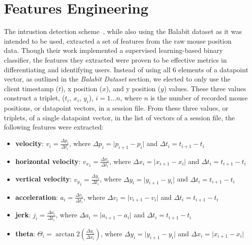 
\section{Features Engineering}\label{sec:features-engineering}
The intrustion detection scheme~\cite{intrustion_detection_using_mouse_dynamics}, while also using the Balabit dataset as it was intended to be used, extracted a set of features from the raw mouse position data.
Though their work implemented a supervised learning-based binary classifier, the features they extracted were proven to be effective metrics in differentiating and identifying users.
Instead of using all 6 elements of a datapoint vector, as outlined in the \textit{Balabit Dataset} section, we elected to only use the client timestamp ($t$), x position ($x$), and y position ($y$) values.
These three values construct a triplet, ($t_i$, $x_i$, $y_i$), $i = 1{\dots}n$, where $n$ is the number of recorded mouse positions, or datapoint vectors, in a session file.
From these three values, or triplets, of a single datapoint vector, in the list of vectors of a session file, the following features were extracted:
\begin{itemize}
    \item \textbf{velocity}: $v_i = \frac{\Delta p_i}{\Delta t_i}$, where $\Delta p_i = \lvert p_{i+1} - p_i \rvert$ and $\Delta t_i = t_{i+1} - t_i$
    \item \textbf{horizontal velocity}: ${v_x}_i = \frac{\Delta x_i}{\Delta t_i}$, where $\Delta x_i = \lvert x_{i+1} - x_i \rvert$ and $\Delta t_i = t_{i+1} - t_i$
    \item \textbf{vertical velocity}: ${v_y}_i = \frac{\Delta y_i}{\Delta t_i}$, where $\Delta y_i = \lvert y_{i+1} - y_i \rvert$ and $\Delta t_i = t_{i+1} - t_i$
    \item \textbf{acceleration}: $a_i = \frac{\Delta v_i}{\Delta t_i}$, where $\Delta v_i = \lvert v_{i+1} - v_i \rvert$ and $\Delta t_i = t_{i+1} - t_i$
    \item \textbf{jerk}: $j_i = \frac{\Delta a_i}{\Delta t_i}$, where $\Delta a_i = \lvert a_{i+1} - a_i \rvert$ and $\Delta t_i = t_{i+1} - t_i$
    \item \textbf{theta}: $\Theta _i = \arctan 2(\frac{\Delta y_i}{\Delta x_i})$, where $\Delta y_i = \lvert y_{i+1} - y_i \rvert$ and $\Delta x_i = \lvert x_{i+1} - x_i \rvert$
\end{itemize}

